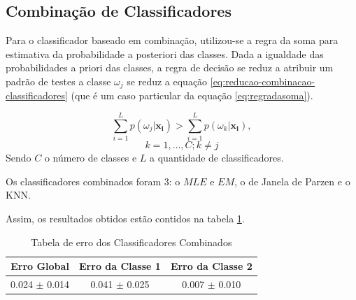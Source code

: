 \subsection{Combinação de Classificadores}
\label{subsec:exp-combinacaodeclassificadores}


Para o classificador baseado em combinação, utilizou-se a regra da soma para estimativa da probabilidade a posteriori das classes. Dada a igualdade das probabilidades a priori das classes, a regra de decisão se reduz a atribuir um padrão de testes a classe $\omega_j$ se reduz a equação \ref{eq:reducao-combinacao-classificadores} (que é um caso particular da equação \ref{eq:regradasoma}).

\begin{equation}
\label{eq:reducao-combinacao-classificadores}
\sum_{i = 1}^{L} p(\omega_j | \mathbf{x_i}) > \sum_{i = 1}^{L} p(\omega_k | \mathbf{x_i}),
\end{equation}
\[k = 1, \ldots, C;     k \ne j \] Sendo $C$ o número de classes e $L$ a quantidade de classificadores.


Os classificadores combinados foram 3: o $MLE$ e $EM$, o de Janela de Parzen e o KNN.

Assim, os resultados obtidos estão contidos na tabela \ref{tab:erro-combinacao}.

\begin{table}[H]
\begin{center}
\begin{tabular}{|c|c|c|}
\hline
Erro Global			&	Erro da Classe 1	&	Erro da Classe 2	\\
\hline %
0.024 $\pm$ 0.014	&	0.041 $\pm$ 0.025	&	0.007 $\pm$ 0.010	\\
\hline
\end{tabular}%
\end{center}   %
\caption{Tabela de erro dos Classificadores Combinados}
\label{tab:erro-combinacao}
\end{table}




